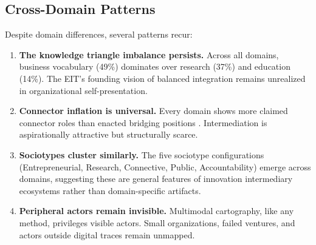 \documentclass[../main.tex]{subfiles}
\begin{document}
\subsection{Cross-Domain Patterns}

Despite domain differences, several patterns recur:

\begin{enumerate}
\item \textbf{The knowledge triangle imbalance persists.} Across all domains, business vocabulary (49\%) dominates over research (37\%) and education (14\%). The EIT's founding vision of balanced integration remains unrealized in organizational self-presentation.

\begin{marginfigure}
\centering
{}
\caption{Knowledge triangle imbalance: vocabulary distribution across EIT domains.}
\end{marginfigure}

\item \textbf{Connector inflation is universal.} Every domain shows more claimed connector roles than enacted bridging positions \cite{howells2006intermediation,kivimaa2019innovation}. Intermediation is aspirationally attractive but structurally scarce.

\item \textbf{Sociotypes cluster similarly.} The five sociotype configurations (Entrepreneurial, Research, Connective, Public, Accountability) emerge across domains, suggesting these are general features of innovation intermediary ecosystems rather than domain-specific artifacts.

\item \textbf{Peripheral actors remain invisible.} Multimodal cartography, like any method, privileges visible actors. Small organizations, failed ventures, and actors outside digital traces remain unmapped.
\end{enumerate}
\end{document}
